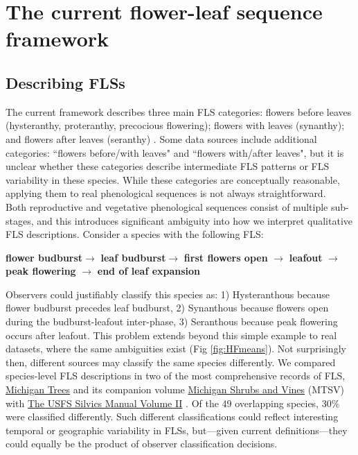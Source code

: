 \documentclass[11pt]{article}
\begin{document}
{\section*{The current flower-leaf sequence framework}
\subsection*{Describing FLSs}
\noindent  The current framework describes three main FLS categories: flowers before leaves (hysteranthy, proteranthy, precocious flowering); flowers with leaves (synanthy); and flowers after leaves (seranthy) \citep{Lamont2011, Heinig1899}. Some data sources \citep[e.g.][]{Burns1990,Barnes2004} include additional categories: ``flowers before/with leaves" and ``flowers with/after leaves", but it is unclear whether these categories describe intermediate FLS patterns or FLS variability in these species. While these categories are conceptually reasonable, applying them to real phenological sequences is not always straightforward.\\

\noindent Both reproductive and vegetative phenological sequences consist of multiple sub-stages, and this introduces significant ambiguity into how we interpret qualitative FLS descriptions. Consider a species with the following FLS:\\

\begin{center}
\textbf{flower budburst}$\rightarrow$ \textbf{leaf budburst}$\rightarrow$ \textbf{first flowers open} $\rightarrow$ \textbf{leafout} $\rightarrow$ \textbf{peak flowering} $\rightarrow$ \textbf{end of leaf expansion} \\
\end{center}

\noindent Observers could justifiably classify this species as: 1) Hysteranthous because flower budburst precedes leaf budburst, 2) Synanthous because flowers open during the budburst-leafout inter-phase, 3) Seranthous because peak flowering occurs after leafout. This problem extends beyond this simple example to real datasets, \citep[e.g.][]{OKeefe2015} where the same ambiguities exist (Fig \ref{fig:HFmeans}). Not surprisingly then, different sources may classify the same species differently. We compared species-level FLS descriptions in two of the most comprehensive records of FLS, \underline{Michigan Trees} and its companion volume \underline{Michigan Shrubs and Vines} (MTSV) \citep{Barnes2004,Barnes2016} with \underline{The USFS Silvics Manual Volume II} \citep{Burns1990}. Of the 49 overlapping species, 30\% were classified differently. Such different classifications could reflect interesting temporal or geographic variability in FLSs, but---given current definitions---they could equally be the product of observer classification decisions.\\

}
\end{document}
